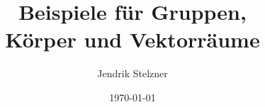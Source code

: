 \documentclass[a4paper,10pt,twoside=semi,openany]{scrbook}
\title{Beispiele für Gruppen, \\ Körper und Vektorräume}
\author{Jendrik Stelzner}
\date{\today}
\begin{document}
\frontmatter
\maketitle

\tableofcontents

\mainmatter





\appendix
\appendixpage

\end{document}
